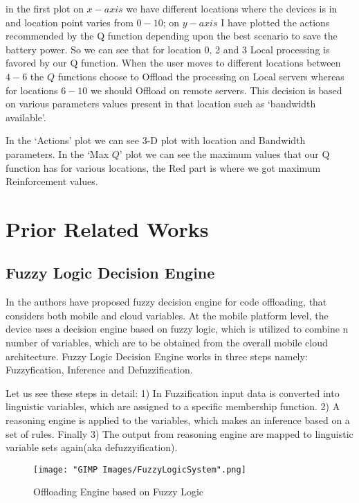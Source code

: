 \documentclass{report}
\begin{document}
in the first plot on $x-axis$ we have different locations where the devices is in and location point varies from $0-10$; on $y-axis$ I have plotted the actions recommended by the Q function depending upon the best scenario to save the battery power. So we can see that for location 0, 2 and 3 Local processing is favored by our Q function. When the user moves to different locations between $4-6$ the $Q$ functions choose to Offload the processing on Local servers whereas for locations $6-10$ we should Offload on remote servers. This decision is based on various parameters values present in that location such as `bandwidth available'. \par
In the `Actions' plot we can see 3-D plot with location and Bandwidth parameters. In the `Max $Q$' plot we can see the maximum values that our Q function has for various locations, the Red part is where we got maximum Reinforcement values. 

\chapter{Prior Related Works}
\label{chap:PriorRelatedWork}

\section{Fuzzy Logic Decision Engine}

In \cite{flores2013adaptive} the authors have proposed fuzzy decision engine for code offloading, that considers both mobile and cloud variables. At the mobile platform level, the device uses a decision engine based on fuzzy logic, which is utilized to
combine n number of variables, which are to be obtained from the overall mobile cloud architecture. Fuzzy
Logic Decision Engine works in three steps namely: Fuzzyfication, Inference and Defuzzification. 

Let us see these steps in detail:
1) In Fuzzification input data is converted into linguistic variables, which are assigned to a specific
membership function. 2) A reasoning engine is applied to the variables, which makes an inference based on
a set of rules. Finally 3) The output from reasoning engine are mapped to linguistic variable sets again(aka
defuzzyification).
\begin{figure}[h]
  \centering
  \texttt{[image: "GIMP Images/FuzzyLogicSystem".png]}
  \caption{Offloading Engine based on Fuzzy Logic}
  \label{fig:FuzzyLogicSystem}
\end{figure}
\end{document}
